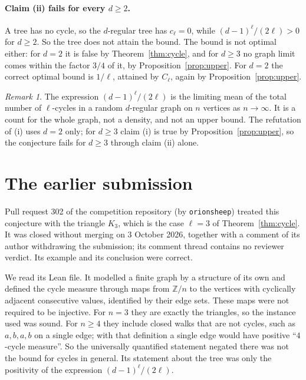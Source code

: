 \documentclass[11pt]{article}
\theoremstyle{remark}
\newtheorem*{remark}{Remark}
\begin{document}
\paragraph{Claim (ii) fails for every $d\ge2$.}
A tree has no cycle, so the $d$-regular tree has $c_\ell=0$, while
$(d-1)^\ell/(2\ell)>0$ for $d\ge2$. So the tree does not attain the
bound. The bound is not optimal either: for $d=2$ it is false by
Theorem~\ref{thm:cycle}, and for $d\ge3$ no graph limit comes within
the factor $3/4$ of it, by Proposition~\ref{prop:upper}. For $d=2$ the
correct optimal bound is $1/\ell$, attained by $C_\ell$, again by
Proposition~\ref{prop:upper}.

\begin{remark}
The expression $(d-1)^\ell/(2\ell)$ is the limiting mean of the total
number of $\ell$-cycles in a random $d$-regular graph on $n$ vertices
as $n\to\infty$. It is a count for the whole graph, not a density, and
not an upper bound. The refutation of (i) uses $d=2$ only; for
$d\ge3$ claim (i) is true by Proposition~\ref{prop:upper}, so the
conjecture fails for $d\ge3$ through claim (ii) alone.
\end{remark}

\section*{The earlier submission}
Pull request 302 of the competition repository (by
\texttt{orionsheep}) treated this conjecture with the triangle $K_3$,
which is the case $\ell=3$ of Theorem~\ref{thm:cycle}. It was closed
without merging on 3 October 2026, together with a comment of its
author withdrawing the submission; its comment thread contains no
reviewer verdict. Its example and its conclusion were correct.

We read its Lean file. It modelled a finite graph by a structure of its
own and defined the cycle measure through maps from $\mathbb Z/n$ to
the vertices with cyclically adjacent consecutive values, identified by
their edge sets. These maps were not required to be injective. For
$n=3$ they are exactly the triangles, so the instance used was sound.
For $n\ge4$ they include closed walks that are not cycles, such as
$a,b,a,b$ on a single edge; with that definition a single edge would
have positive ``$4$-cycle measure''. So the universally quantified
statement negated there was not the bound for cycles in general. Its
statement about the tree was only the positivity of the expression
$(d-1)^\ell/(2\ell)$.
\end{document}
